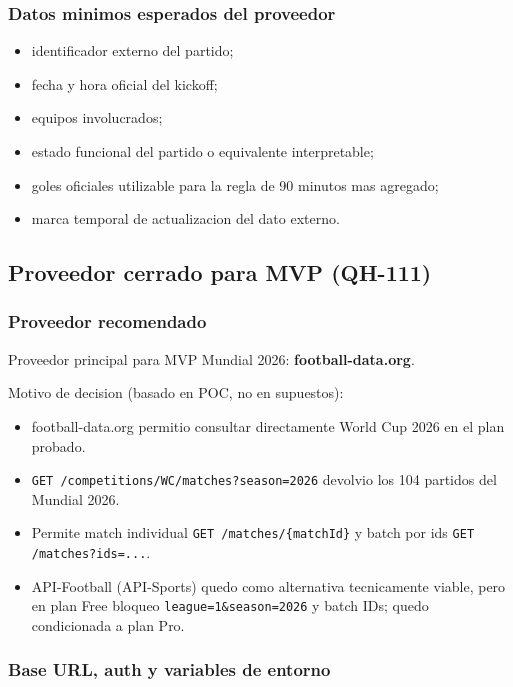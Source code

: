 \subsubsection{Datos minimos esperados del proveedor}

\begin{itemize}
  \item identificador externo del partido;
  \item fecha y hora oficial del kickoff;
  \item equipos involucrados;
  \item estado funcional del partido o equivalente interpretable;
  \item goles oficiales utilizable para la regla de 90 minutos mas agregado;
  \item marca temporal de actualizacion del dato externo.
\end{itemize}

\subsection{Proveedor cerrado para MVP (QH-111)}

\subsubsection{Proveedor recomendado}

Proveedor principal para MVP Mundial 2026: \textbf{football-data.org}.

Motivo de decision (basado en POC, no en supuestos):
\begin{itemize}
  \item football-data.org permitio consultar directamente World Cup 2026 en el plan probado.
  \item \texttt{GET /competitions/WC/matches?season=2026} devolvio los 104 partidos del Mundial 2026.
  \item Permite match individual \texttt{GET /matches/\{matchId\}} y batch por ids \texttt{GET /matches?ids=...}.
  \item API-Football (API-Sports) quedo como alternativa tecnicamente viable, pero en plan Free bloqueo \texttt{league=1\&season=2026} y batch IDs; quedo condicionada a plan Pro.
\end{itemize}

\subsubsection{Base URL, auth y variables de entorno}

